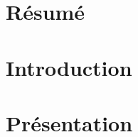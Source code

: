 \documentclass{article}
\author{Mitrovic Nikola [18365]}
\date{29 May 2020}
\begin{document}
\maketitle

\section{Résumé}
\section{Introduction}
\section{Présentation}
\end{document}
